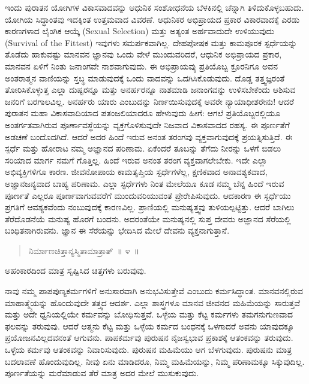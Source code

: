 ಇಂದು ಪುರಾತನ ಯೋಗಿಗಳ ವಿಕಾಸವಾದವನ್ನು ಆಧುನಿಕ ಸಂಶೋಧನೆಯ ಬೆಳಕಿನಲ್ಲಿ ಚೆನ್ನಾಗಿ ತಿಳಿದುಕೊಳ್ಳಬಹುದು. ಯೋಗಿಯ ಸಿದ್ಧಾಂತವು ಇದಕ್ಕಿಂತ ಉತ್ತಮವಾದ ವಿವರಣೆ. ಆಧುನಿಕರ ಅಭಿಪ್ರಾಯದ ಪ್ರಕಾರ ವಿಕಾರವಾದಕ್ಕೆ ಎರಡು ಕಾರಣಗಳಾದ ಲೈಂಗಿಕ ಆಯ್ಕೆ (Sexual Selection) ಮತ್ತು ಅತ್ಯಂತ ಅರ್ಹವಾದುದೇ ಉಳಿಯುವುದು (Survival of the Fittest) ಇವುಗಳು ಸಮರ್ಪಕವಾಗಿಲ್ಲ. ದೇಹಪೋಷಕ ಮತ್ತು ಕಾಮಪೂರಕ ಸ್ಪರ್ಧೆಯನ್ನು ತೊಡೆದು ಹಾಕುವಷ್ಟು ಮಾನವನ ಜ್ಞಾನವು ಒಂದು ವೇಳೆ ಮುಂದುವರಿದರೆ, ಆಧುನಿಕ ಅಭಿಪ್ರಾಯದ ಪ್ರಕಾರ, ಮಾನವನ ಏಳಿಗೆ ನಿಂತು ಜನಾಂಗವೇ ನಾಶವಾಗುವುದು. ಈ ಅಭಿಪ್ರಾಯವ್ಕು ಪ್ರತಿಯೊಬ್ಬ ಕ್ರೂರನಿಗೂ ಅವನ ಅಂತರಾತ್ಮನ ವಾಣಿಯನ್ನು ಸ್ತಬ್ಧ ಮಾಡುವುದಕ್ಕೆ ಒಂದು ವಾದವನ್ನು ಒದಗಿಸಿಕೊಡುವುದು. ದೊಡ್ಡ ತತ್ತ್ವಜ್ಞರಂತೆ ತೋರಿಸಿಕೊಳ್ಳುತ್ತ ಎಲ್ಲಾ ದುಷ್ಟರನ್ನೂ ಮತ್ತು ಅನರ್ಹರನ್ನೂ ನಾಶಮಾಡಿ ಜನಾಂಗವನ್ನು ಉಳಿಸಬೇಕೆಂದು ಆಶಿಸುವ ಜನರಿಗೆ ಬರಗಾಲವಿಲ್ಲ. ಅನರ್ಹರು ಯಾರು ಎಂಬುದನ್ನು ನಿರ್ಣಯಿಸುವುದಕ್ಕೆ ಅವರೇ ನ್ಯಾಯಾಧೀಶರೇನು! ಆದರೆ ಪುರಾತನ ಮಹಾ ವಿಕಾಸವಾದಿಯಾದ ಪತಂಜಲಿಯಾದರೂ ಹೇಳುವುದು ಹೀಗೆ: ಆಗಲೆ ಪ್ರತಿಯೊಬ್ಬರಲ್ಲಿಯೂ ಅಂತರ್ಗತವಾಗಿರುವ ಪೂರ್ಣಾವಸ್ಥೆಯನ್ನು ವ್ಯಕ್ತಗೊಳಿಸುವುದೇ ನಿಜವಾದ ವಿಕಾಸವಾದದ ರಹಸ್ಯ. ಈ ಪೂರ್ಣತೆಗೆ ಅಡಚಣೆ ಬಂದೊದಗಿದೆ. ಆದರೆ ಅದರ ಹಿಂದೆ ಇರುವ ಅನಂತ ತರಂಗವು ವ್ಯಕ್ತವಾಗುವುದಕ್ಕೆ ಪ್ರಯತ್ನಿಸುತ್ತಿದೆ. ಈ ಸ್ಪರ್ಧೆ ಮತ್ತು ಹೋರಾಟ ನಮ್ಮ ಅಜ್ಞಾನದ ಪರಿಣಾಮ. ಏಕೆಂದರೆ ತೂಬನ್ನು ತೆಗೆದು ನೀರನ್ನು ಒಳಗೆ ಬಿಡಲು ಸರಿಯಾದ ಮಾರ್ಗ ನಮಗೆ ಗೊತ್ತಿಲ್ಲ. ಹಿಂದೆ ಇರುವ ಅನಂತ ತರಂಗ ವ್ಯಕ್ತವಾಗಲೇಬೇಕು. ಇದೇ ಎಲ್ಲಾ ಅಭಿವ್ಯಕ್ತಿಗಳಿಗೂ ಕಾರಣ. ಜೀವನೋಪಾಯ ಕಾಮತೃಪ್ತಿಯ ಸ್ಪರ್ಧೆಗಳೆಲ್ಲ, ಕ್ಷಣಿಕವಾದ ಅನಾವಶ್ಯಕವಾದ, ಅಜ್ಞಾನಜನ್ಯವಾದ ಬಾಹ್ಯ ಪರಿಣಾಮ. ಎಲ್ಲಾ ಸ್ಫರ್ಧೆಗಳು ನಿಂತ ಮೇಲೆಯೂ ಕೂಡ ನಮ್ಮ ಬೆನ್ನ ಹಿಂದೆ ಇರುವ ಪೂರ್ಣತೆ ಎಲ್ಲರೂ ಪೂರ್ಣವಾಗುವವರೆಗೆ ಮುಂದುವರಿಯುವಂತೆ ಪ್ರೇರೇಪಿಸುವುದು. ಆದಕಾರಣ ಈ ಸ್ಪರ್ಧೆಯು ಪ್ರಗತಿಗೆ ಆವಶ್ಯಕವೆಂದು ನಂಬುವುದಕ್ಕೆ ಕಾರಣವಿಲ್ಲ. ಪ್ರಾಣಿಯಲ್ಲಿ ಮನುಷ್ಯತ್ತ್ವವು ತುಳಿಯಲ್ಪಟ್ಟಿತ್ತು. ಆದರೆ ಬಾಗಿಲು ತೆರೆದೊಡನೆಯೆ ಮನುಷ್ಯ ಹೊರಗೆ ಬಂದನು. ಅದರಂತೆಯೇ ಮನುಷ್ಯನಲ್ಲಿ ಸುಪ್ತ ದೇವರು ಅಜ್ಞಾನದ ಸೆರೆಯಲ್ಲಿ ಬಂಧಿತನಾಗಿರುವನು. ಜ್ಞಾನ ಈ ಸೆರೆಯನ್ನು ಭೇದಿಸಿದ ಮೇಲೆ ದೇವನು ವ್ಯಕ್ತನಾಗುತ್ತಾನೆ. 

\vspace{-0.3cm}

\begin{verse}
ನಿರ್ಮಾಣಚಿತ್ತಾನ್ಯಸ್ಮಿತಾಮಾತ್ರಾತ್​~॥ ೪~॥
\end{verse}

\vspace{-0.3cm}

ಅಹಂಕಾರದಿಂದ ಮಾತ್ರ ಸೃಷ್ಟಿಸಿದ ಚಿತ್ತಗಳು ಬರುವುವು. 

ನಾವು ನಮ್ಮ ಪಾಪಪುಣ್ಯಕರ್ಮಗಳಿಗೆ ಅನುಸಾರವಾಗಿ ಅನುಭವಿಸುತ್ತೇವೆ ಎಂಬುದು ಕರ್ಮಸಿದ್ಧಾಂತ. ಮಾನವನಲ್ಲಿರುವ ಮಾಹಾತ್ಮ್ಯೆಯನ್ನು ಹೊಂದುವುದೇ ತತ್ತ್ವದ ಆದರ್ಶ. ಎಲ್ಲಾ ಶಾಸ್ತ್ರಗಳೂ ಮಾನವ ಜೀವನದ ಮಹಿಮೆಯನ್ನು ಸಾರುತ್ತವೆ ಮತ್ತು ಅದೇ ಧ್ವನಿಯಲ್ಲಿಯೇ ಕರ್ಮವನ್ನು ಬೋಧಿಸುತ್ತವೆ. ಒಳ್ಳೆಯ ಮತ್ತು ಕೆಟ್ಟ ಕರ್ಮಗಳು ತಮಗನುಗುಣವಾದ ಫಲವನ್ನು ತರುವುವು. ಆದರೆ ಆತ್ಮನು ಕೆಟ್ಟ ಮತ್ತು ಒಳ್ಳೆಯ ಕರ್ಮದ ಬಂಧನಕ್ಕೆ ಒಳಗಾದರೆ ಅವನು ಯಾವುದಕ್ಕೂ ಪ್ರಯೋಜನವಿಲ್ಲದವನಂತೆ ಆಗುವನು. ಪಾಪಕರ್ಮವು ಪುರುಷನ ನೈಜಸ್ವಭಾವ ಪ್ರಕಾಶಕ್ಕೆ ಆತಂಕವನ್ನು ತರುವುದು. ಒಳ್ಳೆಯ ಕರ್ಮವು ಆತಂಕವನ್ನು ನಿವಾರಿಸುವುದು. ಪುರುಷನ ಮಹಿಮೆಯು ಆಗ ಬೆಳಗುವುದು. ಪುರುಷನು ಮಾತ್ರ ಬದಲಾವಣೆ ಹೊಂದುವುದಿಲ್ಲ. ನೀವು ಏನು ಮಾಡಿದರೂ, ನಿಮ್ಮ ಮಹಿಮೆಯನ್ನು, ನಿಮ್ಮ ಪರಿಣಾಮಕ್ಕೂ ಸಿಕ್ಕುವುದಿಲ್ಲ. ಪೂರ್ಣತೆಯನ್ನು ಮರೆಮಾಡುವ ತೆರೆ ಮಾತ್ರ ಅದರ ಮೇಲೆ ಮುಸುಕುವುದು. 


